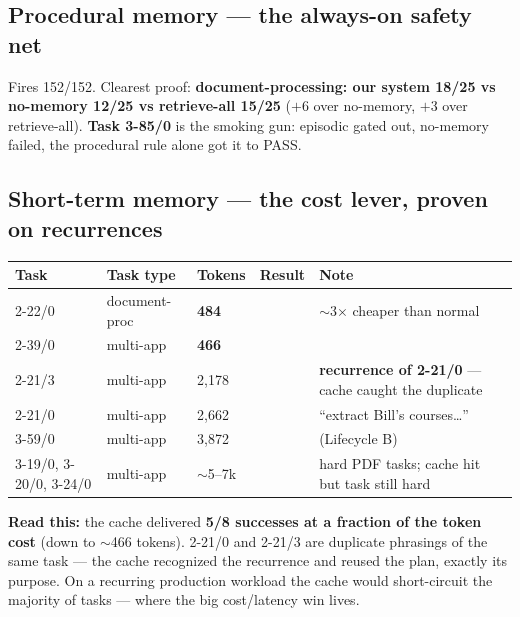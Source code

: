 \documentclass[11pt]{article}
\newcommand{\cmark}{\textcolor{green!55!black}{\ding{51}}}
\newcommand{\xmark}{\textcolor{red!75!black}{\ding{55}}}
\begin{document}
\subsection{Procedural memory --- the always-on safety net}
Fires 152/152. Clearest proof: \textbf{document-processing: our system 18/25 vs no-memory 12/25 vs
retrieve-all 15/25} ($+6$ over no-memory, $+3$ over retrieve-all). \textbf{Task 3-85/0} is the smoking
gun: episodic gated out, no-memory failed, the procedural rule alone got it to PASS.

\subsection{Short-term memory --- the cost lever, proven on recurrences}
\begin{center}
\begin{tabular}{@{}lllll@{}}
\toprule
Task & Task type & Tokens & Result & Note \\
\midrule
2-22/0 & document-proc & \textbf{484}  & \cmark & $\sim$3$\times$ cheaper than normal \\
2-39/0 & multi-app     & \textbf{466}  & \cmark & \\
2-21/3 & multi-app     & 2{,}178       & \cmark & \textbf{recurrence of 2-21/0} --- cache caught the duplicate \\
2-21/0 & multi-app     & 2{,}662       & \cmark & ``extract Bill's courses\ldots'' \\
3-59/0 & multi-app     & 3{,}872       & \cmark & (Lifecycle B) \\
3-19/0, 3-20/0, 3-24/0 & multi-app & $\sim$5--7k & \xmark & hard PDF tasks; cache hit but task still hard \\
\bottomrule
\end{tabular}
\end{center}
\textbf{Read this:} the cache delivered \textbf{5/8 successes at a fraction of the token cost} (down to
$\sim$466 tokens). 2-21/0 and 2-21/3 are duplicate phrasings of the same task --- the cache recognized the
recurrence and reused the plan, exactly its purpose. On a recurring production workload the cache would
short-circuit the majority of tasks --- where the big cost/latency win lives.

\end{document}
